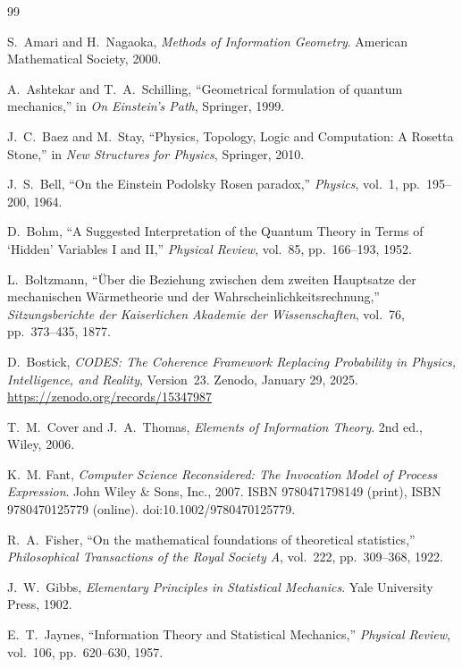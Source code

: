 \documentclass[12pt]{article}
\begin{document}
\begin{thebibliography}{99}

S.~Amari and H.~Nagaoka,
\textit{Methods of Information Geometry}.
American Mathematical Society, 2000.

A.~Ashtekar and T.~A.~Schilling,
``Geometrical formulation of quantum mechanics,''
in \textit{On Einstein's Path}, Springer, 1999.

J.~C.~Baez and M.~Stay,
``Physics, Topology, Logic and Computation: A Rosetta Stone,''
in \textit{New Structures for Physics}, Springer, 2010.

J.~S.~Bell,
``On the Einstein Podolsky Rosen paradox,''
\textit{Physics}, vol.~1, pp.~195--200, 1964.

D.~Bohm,
``A Suggested Interpretation of the Quantum Theory in Terms of `Hidden' Variables I and II,''
\textit{Physical Review}, vol.~85, pp.~166--193, 1952.

L.~Boltzmann,
``\"Uber die Beziehung zwischen dem zweiten Hauptsatze der mechanischen W\"armetheorie
und der Wahrscheinlichkeitsrechnung,''
\textit{Sitzungsberichte der Kaiserlichen Akademie der Wissenschaften}, vol.~76, pp.~373--435, 1877.

D.~Bostick,
\textit{CODES: The Coherence Framework Replacing Probability in Physics, Intelligence, and Reality},
Version~23. Zenodo, January 29, 2025.
\url{https://zenodo.org/records/15347987}

T.~M.~Cover and J.~A.~Thomas,
\textit{Elements of Information Theory}.
2nd ed., Wiley, 2006.

K.~M. Fant,
\textit{Computer Science Reconsidered: The Invocation Model of Process Expression}.
John Wiley \& Sons, Inc., 2007.
ISBN 9780471798149 (print), ISBN 9780470125779 (online).
doi:10.1002/9780470125779.

R.~A.~Fisher,
``On the mathematical foundations of theoretical statistics,''
\textit{Philosophical Transactions of the Royal Society A}, vol.~222, pp.~309--368, 1922.

J.~W.~Gibbs,
\textit{Elementary Principles in Statistical Mechanics}.
Yale University Press, 1902.

E.~T.~Jaynes,
``Information Theory and Statistical Mechanics,''
\textit{Physical Review}, vol.~106, pp.~620--630, 1957.


\end{thebibliography}
\end{document}
